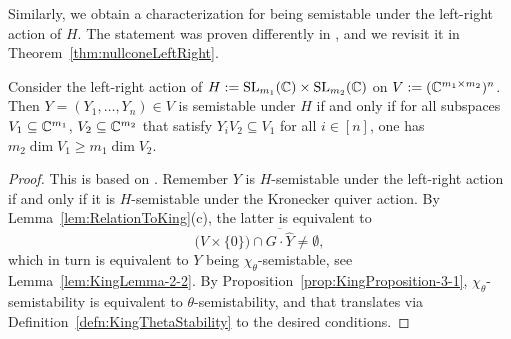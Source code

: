 Similarly, we obtain a characterization for being semistable under the left-right action of $H$. The statement was proven differently in \cite[Proposition~2.1]{BurginDraisma}, and we revisit it in Theorem~\ref{thm:nullconeLeftRight}.

\begin{prop}\label{prop:KingSemistable}
	Consider the left-right action of $H := \operatorname{SL}_{m_1}(\mathbb C) \times \operatorname{SL}_{m_2}(\mathbb C)$ on $V:= (\mathbb C^{m_1 \times m_2})^n$.
	Then $Y = (Y_1,\ldots,Y_n) \in V$ is semistable under $H$ if and only if
	for all subspaces  $V_1 \subseteq \mathbb C^{m_1}$, $V_2 \subseteq \mathbb C^{m_2}$ that satisfy $Y_i V_2 \subseteq V_1$ for all $i \in [n]$, one has $m_2 \dim V_1 \geq m_1 \dim V_2$.
\end{prop}

\begin{proof}
	This is based on \cite[Remark~A.2]{SiagaPaper}. Remember $Y$ is $H$-semistable under the left-right action if and only if it is $H$-semistable under the Kronecker quiver action.
	By Lemma~\ref{lem:RelationToKing}(c), the latter is equivalent to 
	\begin{equation*}
		\big( V \times \lbrace 0 \rbrace \big) \cap \overline{G \cdot \hat{Y}} \neq \emptyset,
	\end{equation*}
	which in turn is equivalent to $Y$ being $\chi_\theta$-semistable, see Lemma~\ref{lem:KingLemma-2-2}. By Proposition~\ref{prop:KingProposition-3-1}, $\chi_\theta$-semistability is equivalent to $\theta$-semistability, and that translates via Definition~\ref{defn:KingThetaStability} to the desired conditions.
\end{proof}








